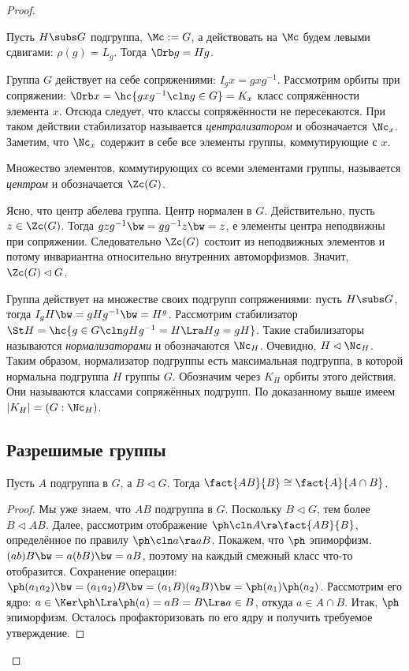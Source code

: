 \documentclass[a4paper]{article}
\newcommand{\kph}{\Ker \ph}
\begin{document}
\begin{proof}
\begin{ex}
Пусть $H \subs G$ подгруппа, $\Mc := G$, а действовать на $\Mc$ будем левыми  сдвигами: $\rho(g) = L_g$.
Тогда $\Orb g = Hg$.
\end{ex}

\begin{ex}
Группа $G$ действует на себе сопряжениями: $I_g x=gxg^{-1}$. Рассмотрим орбиты  при сопряжении: $\Orb x =
\hc{gxg^{-1}\cln g \in G} = K_x$ класс сопряжённости элемента $x$. Отсюда следует, что классы сопряжённости не
пересекаются. При таком действии стабилизатор называется \emph{централизатором} и обозначается $\Nc_x$.
Заметим, что $\Nc_x$ содержит в себе все элементы группы, коммутирующие с $x$.
\end{ex}

\begin{df}
Множество элементов, коммутирующих со всеми элементами группы, называется  \emph{центром} и
обозначается $\Zc(G)$.
\end{df}

Ясно, что центр абелева группа. Центр нормален в $G$. Действительно, пусть $z \in \Zc(G)$. Тогда
$gzg^{-1}\bw=gg^{-1}z\bw=z$, е элементы центра неподвижны при сопряжении. Следовательно $\Zc(G)$ состоит из
неподвижных элементов и потому инвариантна относительно внутренних автоморфизмов. Значит, $\Zc(G) \lhd G$.

\begin{ex}
Группа действует на множестве своих подгрупп сопряжениями: пусть $H \subs G$,  тогда $I_g H \bw= gHg^{-1} \bw=
H^g$. Рассмотрим стабилизатор $\St H = \hc{g \in G\cln gHg^{-1}=H \Lra Hg = gH}$. Такие стабилизаторы называются
\emph{нормализаторами} и обозначаются $\Nc_H$. Очевидно, $H \lhd \Nc_H$. Таким образом, нормализатор
подгруппы есть максимальная подгруппа, в которой нормальна подгруппа $H$ группы $G$. Обозначим через $K_H$
орбиты этого действия. Они называются классами сопряжённых подгрупп. По доказанному выше имеем $|K_H| =
(G: \Nc_H)$.
\end{ex}

\subsection{Разрешимые группы}

\begin{theorem}
Пусть $A$ подгруппа в $G$, а $B \lhd G$. Тогда $\fact{AB}{B} \cong \fact{A}{A \cap B}$.
\end{theorem}
\begin{proof}
Мы уже знаем, что $AB$ подгруппа в $G$. Поскольку $B \lhd G$, тем более  $B \lhd AB$. Далее, рассмотрим
отображение $\ph\cln A \ra \fact{AB}{B}$, определённое по правилу $\ph\cln a \ra aB$. Покажем, что $\ph$
эпиморфизм. $(ab)B \bw= a(bB) \bw= aB$, поэтому на каждый смежный класс что-то отобразится. Сохранение операции:
$\ph(a_1a_2) \bw= (a_1a_2)B \bw= (a_1B)(a_2B) \bw= \ph(a_1)\ph(a_2)$. Рассмотрим его ядро: $a \in \kph \Lra \ph(a)=aB=B \Lra
a \in B$, откуда $a \in A \cap B$. Итак, $\ph$ эпиморфизм. Осталось профакторизовать по его ядру и получить
требуемое утверждение.
\end{proof}


\end{proof}
\end{document}
